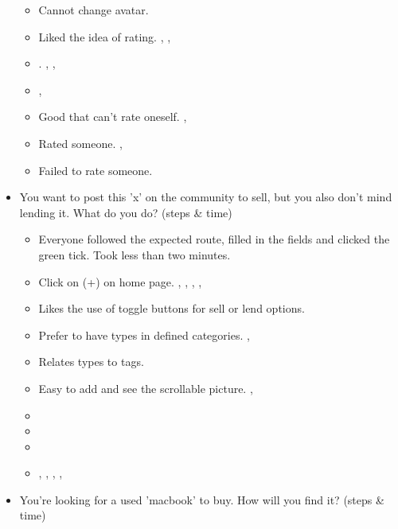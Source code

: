 \begin{itemize}
{\begin{itemize}
\begin{itemize}
					\item Cannot change avatar. 
					\item Liked the idea of rating. , , 
					\item {}. , , 
					\item {} , 
					\item Good that can't rate oneself. , 
					\item Rated someone. , 
					\item Failed to rate someone. 
				\end{itemize}
		\end{itemize}
		}
		\tab
	\item You want to post this 'x' on the community to sell, but you also don't mind lending it. What do you do? (steps \& time)
		\begin{itemize}
			\item Everyone followed the expected route, filled in the fields and clicked the green tick. Took less than two minutes.
			\item Click on (+) on home page. , , , , 
			\item Likes the use of toggle buttons for sell or lend options. 
			\item Prefer to have types in defined categories. , 
			\item Relates types to tags. 
			\item Easy to add and see the scrollable picture. , 
			\vspace{0.5cm}
			\item {}
			\item {} 
			\item {} 
			\item {} , , , , 
		\end{itemize}
		\tab	
	\item You're looking for a used 'macbook' to buy. How will you find it? (steps \& time)

\end{itemize}
